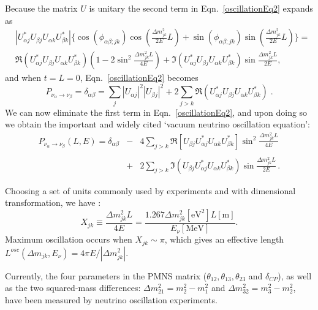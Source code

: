 Because the matrix $U$ is unitary the second term in Eqn.~\ref{oscillationEq2} expands as
\begin{equation}
 \begin{split}
&|U^*_{\alpha j}U_{\beta j}U_{\alpha k}U^*_{\beta k}|\{\cos(\phi_{\alpha\beta;jk})\cos(\frac{\Delta m^2_{jk}}{2E}L)+\sin(\phi_{\alpha\beta;jk})\sin(\frac{\Delta m^2_{jk}}{2E}L)\}=\\
&\Re(U^*_{\alpha j}U_{\beta j}U_{\alpha k}U^*_{\beta k})(1-2\sin^2\frac{\Delta m^2_{jk}L}{4E})+\Im(U^*_{\alpha j}U_{\beta j}U_{\alpha k}U^*_{\beta k})\sin\frac{\Delta m^2_{jk}L}{2E},
 \end{split}
\end{equation}
and when $t=L=0$, Eqn.~\ref{oscillationEq2} becomes
\begin{equation}
P_{\nu_\alpha\to\nu_\beta}=\delta_{\alpha\beta}=\sum_j |U_{\alpha j}|^2|U_{\beta j}|^2+2\sum_{j>k}\Re(U^*_{\alpha j}U_{\beta j}U_{\alpha k}U^*_{\beta k}) \; .
\end{equation} 
We can now eliminate the first term in Eqn.~\ref{oscillationEq2}, and upon doing so we obtain the important and widely cited `vacuum neutrino oscillation equation'\cite{pdg2020,aitchison2012gauge}:
\begin{eqnarray}\label{common_oscillation}
P_{\nu_\alpha\to\nu_\beta}(L,E) = \delta_{\alpha\beta} &-& 4\sum_{j>k} \Re[U_{\beta j}U^*_{\alpha j}U_{\alpha k}U^*_{\beta k}]\sin^2\frac{\Delta m^2_{jk}L}{4E} \nonumber\\
&\;& \\
&+& 2\sum_{j>k} \Im(U_{\beta j}U^*_{\alpha j}U_{\alpha k}U^*_{\beta k})\sin\frac{\Delta m^2_{jk}L}{2E} \nonumber \, .
\end{eqnarray}

Choosing a set of units commonly used by experiments and with dimensional transformation, we have \cite{pdg2020}:
\begin{equation}\label{oscillationCondition}
X_{jk}\equiv \frac{\Delta m^2_{jk}L}{4E}=\frac{1.267\Delta m_{jk}^2[\mathrm{eV}^2]L[\mathrm{m}]}{E_\nu[\mathrm{MeV}]}.
\end{equation}
Maximum oscillation occurs when $X_{jk}\sim \pi$, which gives an effective length $L^{osc}(\Delta m_{jk},E_\nu)=4\pi E/|\Delta m_{jk}^2|$.

Currently, the four parameters in the PMNS matrix ($\theta_{12},\theta_{13},\theta_{23}$ and $\delta_{CP}$), as well as the two squared-mass differences: $\Delta m^2_{21}=m_2^2-m_1^2$ and $\Delta m^2_{32}=m^2_3-m^2_2$, have been measured by neutrino oscillation experiments. 

